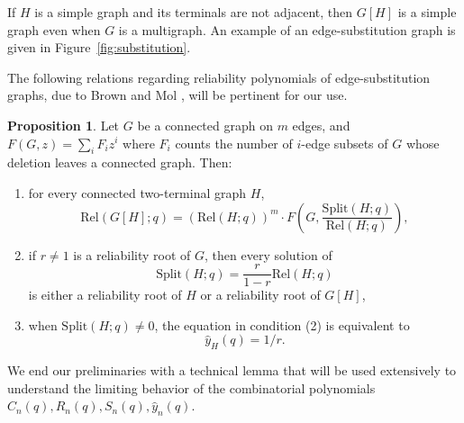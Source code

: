 \documentclass[12pt]{amsart}
\theoremstyle{definition}
\newtheorem{proposition}[theorem]{Proposition}
\renewcommand{\S}{\text{Split}}
\newcommand{\R}{\text{Rel}}
\begin{document}
If $H$ is a simple graph and its terminals are not adjacent, then $G[H]$ is a simple graph even when $G$ is a multigraph. An example of an edge-substitution graph is given in Figure~\ref{fig:substitution}.

The following relations regarding reliability polynomials of edge-substitution graphs, due to Brown and Mol \cite{BrownMol2017}, will be pertinent for our use.

\begin{proposition}\label{prop:substitutionpolynomials}
Let $G$ be a connected graph on $m$ edges, and $F(G,z)=\sum_i F_i z^i$ where $F_i$ counts the number of $i$-edge subsets of $G$ whose deletion leaves a connected graph. Then:

\begin{enumerate}
\item for every connected two-terminal graph $H$,
\[
\R(G[H];q)=(\R(H;q))^m \cdot F\left(G,\frac{\S(H;q)}{\R(H;q)}\right),
\]
\item if $r \neq 1$ is a reliability root of $G$, then every solution of
\[
\S(H;q)=\frac{r}{1-r}\R(H;q)
\]
is either a reliability root of $H$ or a reliability root of $G[H]$,
\item when $\S(H;q) \neq 0$, the equation in condition (2) is equivalent to
\[
\hat{y}_H(q)=1/r.
\]
\end{enumerate}
\end{proposition}

We end our preliminaries with a technical lemma that will be used extensively to understand the limiting behavior of the combinatorial polynomials $C_n(q),R_n(q),S_n(q),\hat{y}_n(q)$.
\end{document}
